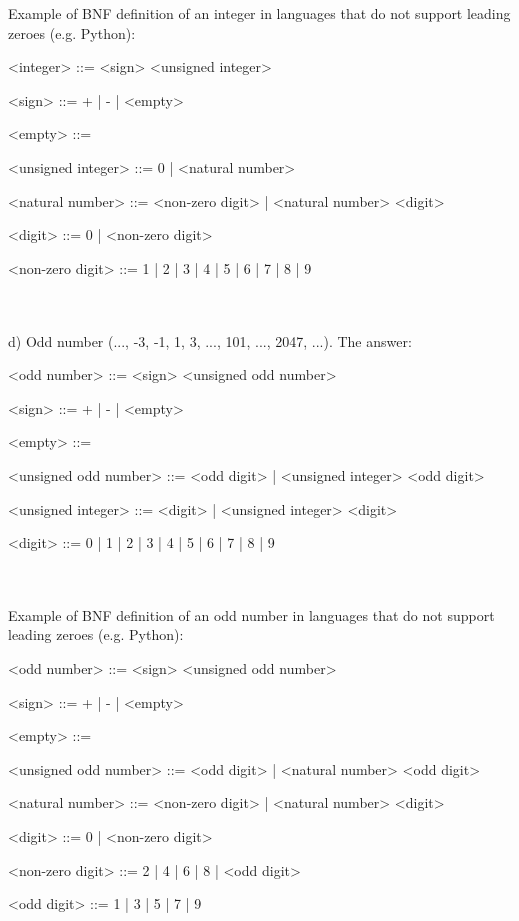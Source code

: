 \documentclass{article}
\begin{document}
		Example of BNF definition of an integer in languages that do not support leading zeroes (e.g. Python):
			
	\ttfamily
	\begin{grammar}
		
		<integer> ::= <sign> <unsigned integer>
		
		<sign> ::= + | - | <empty>
		
		<empty> ::= \
		
		<unsigned integer> ::= 0 | <natural number>
		
		<natural number> ::= <non-zero digit> | <natural number> <digit>

		<digit> ::= 0 | <non-zero digit>
		
		<non-zero digit> ::= 1 | 2 | 3 | 4 | 5 | 6 | 7 | 8 | 9
		
	\end{grammar}



	\paragraph{}
	\rmfamily\
	
		d) Odd number (..., -3, -1, 1, 3, ..., 101, ..., 2047, ...). The answer:
			
	\ttfamily
	\begin{grammar}
	
		<odd number> ::= <sign> <unsigned odd number>
		
		<sign> ::= + | - | <empty>
		
		<empty> ::= \
		
		<unsigned odd number> ::= <odd digit> | <unsigned integer> <odd digit>
		
		<unsigned integer> ::= <digit> | <unsigned integer> <digit>

		<digit> ::= 0 | 1 | 2 | 3 | 4 | 5 | 6 | 7 | 8 | 9

		
	\end{grammar}

		\paragraph{}	
		\rmfamily\
		
		Example of BNF definition of an odd number in languages that do not support leading zeroes (e.g. Python):
			
	\ttfamily
	\begin{grammar}
	
		<odd number> ::= <sign> <unsigned odd number>
		
		<sign> ::= + | - | <empty>
		
		<empty> ::= \
		
		<unsigned odd number> ::= <odd digit> | <natural number> <odd digit>
		
		<natural number> ::= <non-zero digit> | <natural number> <digit>
		
		<digit> ::= 0 | <non-zero digit>
		
		<non-zero digit> ::= 2 | 4 | 6 | 8 | <odd digit>
		
		<odd digit> ::= 1 | 3 | 5 | 7 | 9
		
	\end{grammar}
	
\end{document}
